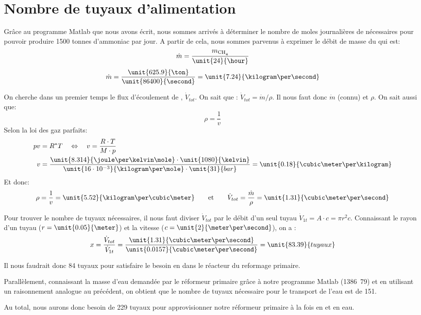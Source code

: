 \section{Nombre de tuyaux d'alimentation}

Grâce au programme Matlab que nous avons écrit, nous sommes arrivés à déterminer le nombre de moles journalières de  nécessaires pour pouvoir produire 1500 tonnes d'ammoniac par jour. A partir de cela, nous sommes parvenus à exprimer le débit de masse du  qui est:
    $$\dot{m}=\frac{m_{\ce{CH4}}}{\unit{24}{\hour}}$$
    $$\dot{m}=\frac{\unit{625.9}{\ton}}{\unit{86400}{\second}}=\unit{7.24}{\kilogram\per\second}$$

On cherche dans un premier temps le flux d'écoulement de , $\dot{V}_{tot}$. On sait que :
$\dot{V}_{tot}={\dot{m}}/{\rho}$.
Il nous faut donc $\dot{m}$ (connu) et $\rho$. On sait aussi que:
\[ \rho = \frac{1}{v} \]
Selon la loi des gaz parfaits:
\begin{align*}
    pv &= R^{*}T \quad\Leftrightarrow\quad v = \frac{R\cdot T}{M\cdot p} \\
    v &= \frac{\unit{8.314}{\joule\per\kelvin\mole}\cdot\unit{1080}{\kelvin}}{\unit{16\cdot10^{-3}}{\kilogram\per\mole}\cdot\unit{31}{bar}}=\unit{0.18}{\cubic\meter\per\kilogram}
\end{align*}
Et donc:
\[
    \rho = \frac{1}{v} = \unit{5.52}{\kilogram\per\cubic\meter}
    \qquad\text{et}\qquad
    \dot{V}_{tot} = \frac{\dot{m}}{\rho}=\unit{1.31}{\cubic\meter\per\second}
\]

Pour trouver le nombre de tuyaux nécessaires, il nous faut diviser $\dot{V}_{tot}$ par le débit d'un seul tuyau $\dot{V}_{1t} = A\cdot c = \pi r^2 c$. Connaissant le rayon d'un tuyau ($r=\unit{0.05}{\meter}$) et la vitesse ($c=\unit{2}{\meter\per\second}$), on a :
\[
    x = \frac{\dot{V}_{tot}}{\dot{V}_{1t}}
      = \frac{\unit{1.31}{\cubic\meter\per\second}}{\unit{0.0157}{\cubic\meter\per\second}}
      = \unit{83.39}{tuyaux}
\]

Il nous faudrait donc 84 tuyaux pour satisfaire le besoin en  dans le réacteur du reformage primaire.

Parallèlement, connaissant la masse d'eau demandée par le réformeur primaire grâce à notre programme Matlab (\unit{1386.79}{\ton}) et en utilisant un raisonnement analogue au précédent, on obtient que le nombre de tuyaux nécessaire pour le transport de l'eau est de 151.

Au total, nous aurons donc besoin de 229 tuyaux pour approvisionner notre réformeur primaire à la fois en  et en eau.
